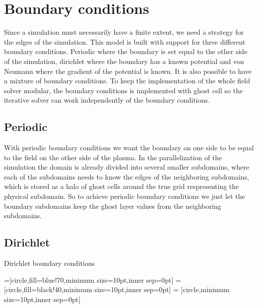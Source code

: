 
\section{Boundary conditions}
	Since a simulation must necessarily have a finite extent, we need a strategy for the edges of the simulation.
	This model is built with support for three different boundary conditions. Periodic where the boundary is set equal
	to the other side of the simulation, dirichlet where the boundary has a known potential and von Neumann
	where the gradient of the potential is known. It is also possible to have a mixture of boundary conditions.
	To keep the implementation of the whole field solver modular, the boundary conditions is implemented with ghost cell
	so the iterative solver can work independently of the boundary conditions.

\subsection{Periodic}
	With periodic boundary conditions we want the boundary on one side to be equal to the field on the other side
	of the plasma. In the parallelization of the simulation the domain is already divided into several smaller subdomains,
	where each of the subdomains needs to know the edges of the neighboring subdomains, which is stored as a halo of
	ghost cells around the true grid respresenting the physical subdomain. So to achieve periodic boundary conditions
	we just let the boundary subdomains keep the ghost layer values from the neighboring subdomains.

\subsection{Dirichlet}
	Dirichlet boundary conditions

	=[circle,fill=blue!70,minimum size=10pt,inner sep=0pt]
	=[circle,fill=black!40,minimum size=10pt,inner sep=0pt]
	 = [circle,minimum size=10pt,inner sep=0pt]

